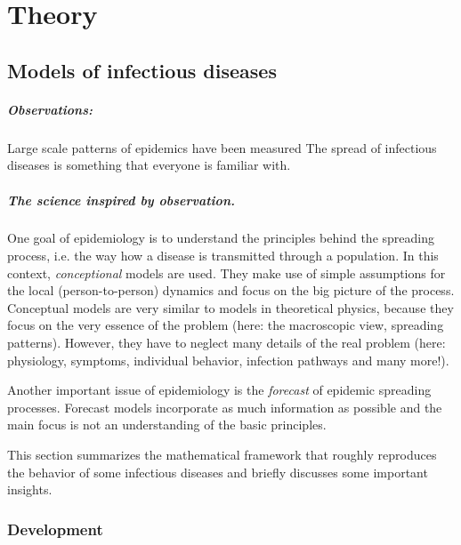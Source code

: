 \documentclass[openright,twoside,headsepline]{scrbook}
\begin{document}
\graphicspath{{/Users/lentz/Documents/GitHub_locals/Thesis/images/}}



\chapter{Theory}

\section{Models of infectious diseases}
\paragraph{Observations:} Large scale patterns of epidemics have been measured \cite{geissel_der_menschheit}
The spread of infectious diseases is something that everyone is familiar with.

\paragraph{The science inspired by observation.} One goal of epidemiology is to understand the principles behind the spreading process, i.e. the way how a disease is transmitted through a population.
In this context, \emph{conceptional} models are used.
They make use of simple assumptions for the local (person-to-person) dynamics and focus on the big picture of the process.
Conceptual models are very similar to models in theoretical physics, because they focus on the very essence of the problem (here: the macroscopic view, spreading patterns).
However, they have to neglect many details of the real problem (here: physiology, symptoms, individual behavior, infection pathways and many more!).

Another important issue of epidemiology is the \emph{forecast} of epidemic spreading processes.
Forecast models incorporate as much information as possible and the main focus is not an understanding of the basic principles.

This section summarizes the mathematical framework that roughly reproduces the behavior of some infectious diseases and briefly discusses some important insights.


\subsection{Development}
\end{document}
